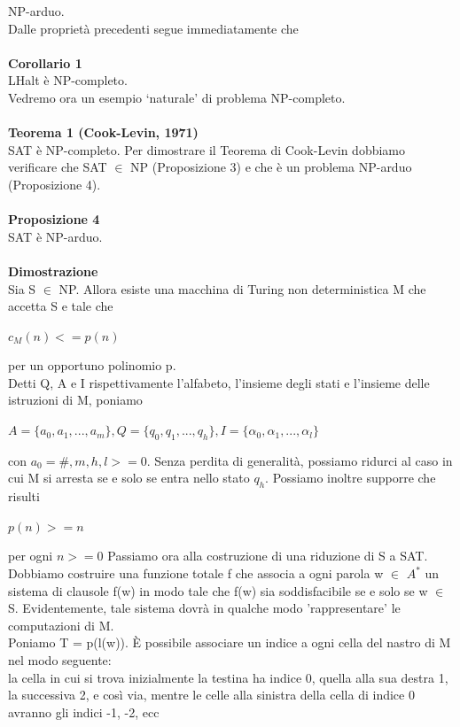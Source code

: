 NP-arduo.
\\Dalle proprietà precedenti segue immediatamente che\\\\
\textbf{Corollario 1}\\ 
LHalt è NP-completo.\\
Vedremo ora un esempio ‘naturale’ di problema NP-completo.\\\\
\textbf{Teorema 1 (Cook-Levin, 1971)}
\\SAT è NP-completo. Per dimostrare il Teorema di Cook-Levin dobbiamo verificare che SAT $\in$ NP (Proposizione 3) e che è un problema NP-arduo (Proposizione 4).\\\\
\textbf{Proposizione 4}
\\SAT è NP-arduo.\\\\
\textbf{Dimostrazione}\\
Sia S $\in$ NP. Allora esiste una macchina di Turing non deterministica M che accetta S e tale che
\begin{center}
    $c_M(n) <= p(n)$
\end{center}
per un opportuno polinomio p.\\
Detti Q, A e I rispettivamente l’alfabeto, l’insieme degli stati e l’insieme delle istruzioni di M, poniamo
\begin{center}
    $A = \{a_0, a_1,..., a_m\} , Q = \{q_0, q_1,..., q_h\} , I = \{\alpha_0, \alpha_1,..., \alpha_l\}$
\end{center}
con $a_0 = \#, m, h, l >= 0$. Senza perdita di generalità, possiamo ridurci al caso in cui M si arresta se e solo se entra nello stato $q_h$. Possiamo inoltre supporre che risulti
\begin{center}
    $p(n) >= n$
\end{center}
per ogni $n>=0$
Passiamo ora alla costruzione di una riduzione di S a SAT. Dobbiamo costruire una funzione totale f che associa a ogni parola w $\in$ $A^*$ un sistema di clausole f(w) in modo tale che f(w) sia soddisfacibile se e solo se w $\in$ S. Evidentemente, tale sistema dovrà in qualche modo 'rappresentare' le computazioni di M.\\
Poniamo T = p(l(w)). È possibile associare un indice a ogni cella del nastro di M nel modo seguente:
\\ la cella in cui si trova inizialmente la testina ha indice 0, quella alla sua destra 1, la successiva 2, e così via, mentre le celle alla sinistra della cella di indice 0 avranno gli indici -1, -2, ecc
